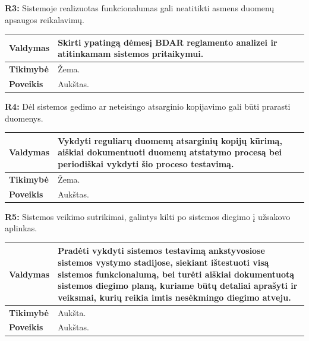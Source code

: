\documentclass[12pt]{article}
\begin{document}
\noindent \textbf{R3:} Sistemoje realizuotas funkcionalumas gali neatitikti
asmens duomenų apsaugos reikalavimų.

\label{sec:R3}
\begin{table}[htb!]
    \captionsetup{justification=centering}
    \vskip -10pt
    \begin{tabular}{|m{3cm}|m{13.7cm}|}
        \hline
        \raggedleft \textbf{\cellcolor{deepchampagne}Valdymas} &
        Skirti ypatingą dėmesį BDAR reglamento analizei ir atitinkamam sistemos
        pritaikymui. \\
        \hline
        \raggedleft \textbf{\cellcolor{deepchampagne}Tikimybė} & Žema. \\
        \hline
        \raggedleft \textbf{\cellcolor{deepchampagne}Poveikis} & Aukštas. \\
        \hline
    \end{tabular}
\end{table}

\noindent \textbf{R4:} Dėl sistemos gedimo ar neteisingo atsarginio kopijavimo
gali būti prarasti duomenys.

\label{sec:R4}
\begin{table}[htb!]
    \captionsetup{justification=centering}
    \vskip -10pt
    \begin{tabular}{|m{3cm}|m{13.7cm}|}
        \hline
        \raggedleft \textbf{\cellcolor{deepchampagne}Valdymas} &
        Vykdyti reguliarų duomenų atsarginių kopijų kūrimą, aiškiai dokumentuoti
        duomenų atstatymo procesą bei periodiškai vykdyti šio proceso
        testavimą. \\
        \hline
        \raggedleft \textbf{\cellcolor{deepchampagne}Tikimybė} & Žema. \\
        \hline
        \raggedleft \textbf{\cellcolor{deepchampagne}Poveikis} & Aukštas. \\
        \hline
    \end{tabular}
\end{table}

\noindent \textbf{R5:} Sistemos veikimo sutrikimai, galintys kilti po
sistemos diegimo į užsakovo aplinkas.

\label{sec:R5}
\begin{table}[htb!]
    \captionsetup{justification=centering}
    \vskip -10pt
    \begin{tabular}{|m{3cm}|m{13.7cm}|}
        \hline
        \raggedleft \textbf{\cellcolor{deepchampagne}Valdymas} &
        Pradėti vykdyti sistemos testavimą ankstyvosiose sistemos vystymo
        stadijose, siekiant ištestuoti visą sistemos funkcionalumą, bei turėti
        aiškiai dokumentuotą sistemos diegimo planą, kuriame būtų detaliai
        aprašyti ir veiksmai, kurių reikia imtis nesėkmingo diegimo atveju. \\
        \hline
        \raggedleft \textbf{\cellcolor{deepchampagne}Tikimybė} & Aukšta. \\
        \hline
        \raggedleft \textbf{\cellcolor{deepchampagne}Poveikis} & Aukštas. \\
        \hline
    \end{tabular}
\end{table}
\end{document}
